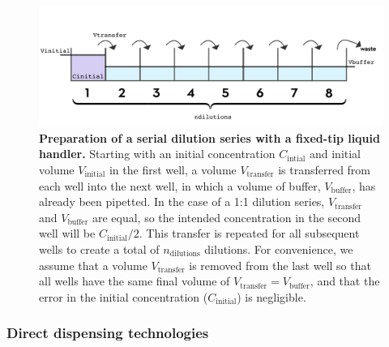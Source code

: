 \documentclass[aps,pre,twocolumn,nofootinbib,superscriptaddress,linenumbers]{revtex4-1}
\begin{document}
\begin{figure}[tb]
    \includegraphics[width=\columnwidth]{../figures/dilution.pdf}

  \caption{{\bf Preparation of a serial dilution series with a fixed-tip liquid handler.}
  Starting with an initial concentration $C_\mathrm{intial}$ and initial volume $V_\mathrm{initial}$ in the first well, a volume $V_\mathrm{transfer}$ is transferred from each well into the next well, in which a volume of buffer, $V_\mathrm{buffer}$, has already been pipetted. 
  In the case of a 1:1 dilution series, $V_\mathrm{transfer}$ and $V_\mathrm{buffer}$ are equal, so the intended concentration in the second well will be $C_\mathrm{initial}/2$. 
  This transfer is repeated for all subsequent wells to create a total of $n_\mathrm{dilutions}$ dilutions. 
  For convenience, we assume that a volume $V_\mathrm{transfer}$ is removed from the last well so that all wells have the same final volume of $V_\mathrm{transfer} = V_\mathrm{buffer}$, and that the error in the initial concentration ($C_\mathrm{initial}$) is negligible.
  }
  \label{fig:dilution}
\end{figure}

\subsubsection*{Direct dispensing technologies}
\end{document}
